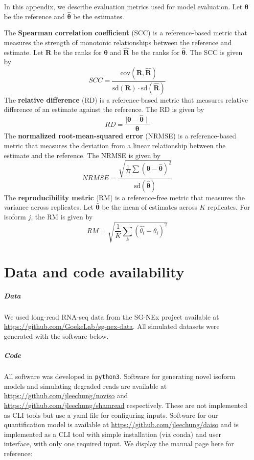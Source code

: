 In this appendix, we describe evaluation metrics used for model evaluation. Let $\bm\theta$ be the reference and $\hat{\bm\theta}$ be the estimates. 

The \textbf{Spearman correlation coefficient} (SCC) is a reference-based metric that measures the strength of monotonic relationships between the reference and estimate. Let $\bm R$ be the ranks for $\bm\theta$ and $\hat{\bm R}$ be the ranks for $\hat{\bm\theta}$. The SCC is given by
\begin{equation}
    SCC = \frac{\textrm{cov}(\bm{R},\hat{\bm{R}})}{\textrm{sd}(\bm{R})\cdot \textrm{sd}(\hat{\bm{R}})}
\end{equation}
The \textbf{relative difference} (RD) is a reference-based metric that measures relative difference of an estimate against the reference. The RD is given by
\begin{equation}
    RD = \frac{\mid\bm\theta-\hat{\bm\theta}\mid}{\bm\theta}
\end{equation}
The \textbf{normalized root-mean-squared error} (NRMSE) is a reference-based metric that measures the deviation from a linear relationship between the estimate and the reference. The NRMSE is given by
\begin{equation}
    NRMSE = \frac{\sqrt{\frac{1}{M}\sum\left(\bm\theta-\hat{\bm\theta}\right)^2}}{\textrm{sd}\left(\hat{\bm\theta}\right)}
\end{equation}
The \textbf{reproducibility metric} (RM) is a reference-free metric that measures the variance across replicates. Let $\bar{\bm\theta}$ be the mean of estimates across $K$ replicates. For isoform $j$, the RM is given by
\begin{equation}
    RM = \sqrt{\frac{1}{K}\sum_k \left(\hat{\theta_i} - \bar{\theta_i}\right)^2}
\end{equation}

\chapter{Data and code availability}

\paragraph{Data}
We used long-read RNA-seq data from the SG-NEx project available at \url{https://github.com/GoekeLab/sg-nex-data}. All simulated datasets were generated with the software below. 

\paragraph{Code}
All software was developed in \texttt{python3}. Software for generating novel isoform models and simulating degraded reads are available at \url{https://github.com/jleechung/noviso} and \url{https://github.com/jleechung/shamread} respectively. These are not implemented as CLI tools but use a yaml file for configuring inputs. Software for our quantification model is available at \url{https://github.com/jleechung/daiso} and is implemented as a CLI tool with simple installation (via conda) and user interface, with only one required input. We display the manual page here for reference: 

